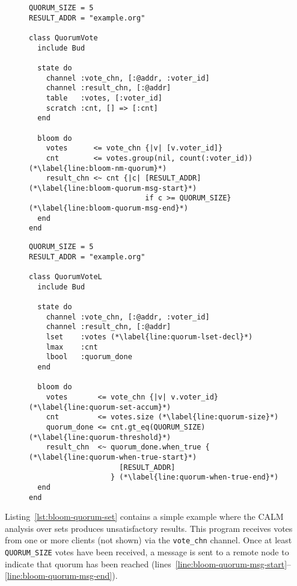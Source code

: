 \begin{figure}[t]
\begin{minipage}{.48\textwidth}
\begin{lstlisting}[caption=Quorum vote in Bloom (non-monotonic).,label=lst:bloom-quorum-set]
QUORUM_SIZE = 5
RESULT_ADDR = "example.org"

class QuorumVote
  include Bud

  state do
    channel :vote_chn, [:@addr, :voter_id]
    channel :result_chn, [:@addr]
    table   :votes, [:voter_id]
    scratch :cnt, [] => [:cnt]
  end

  bloom do
    votes      <= vote_chn {|v| [v.voter_id]}
    cnt        <= votes.group(nil, count(:voter_id)) (*\label{line:bloom-nm-quorum}*)
    result_chn <~ cnt {|c| [RESULT_ADDR] (*\label{line:bloom-quorum-msg-start}*)
                           if c >= QUORUM_SIZE} (*\label{line:bloom-quorum-msg-end}*)
  end
end
\end{lstlisting}
\end{minipage}
\begin{minipage}{.48\textwidth}
\begin{lstlisting}[caption=Quorum vote in \blooml (monotonic).,label=lst:bloom-quorum-lattice]
QUORUM_SIZE = 5
RESULT_ADDR = "example.org"

class QuorumVoteL
  include Bud

  state do
    channel :vote_chn, [:@addr, :voter_id]
    channel :result_chn, [:@addr]
    lset    :votes (*\label{line:quorum-lset-decl}*)
    lmax    :cnt
    lbool   :quorum_done
  end

  bloom do
    votes       <= vote_chn {|v| v.voter_id} (*\label{line:quorum-set-accum}*)
    cnt         <= votes.size (*\label{line:quorum-size}*)
    quorum_done <= cnt.gt_eq(QUORUM_SIZE) (*\label{line:quorum-threshold}*)
    result_chn  <~ quorum_done.when_true { (*\label{line:quorum-when-true-start}*)
                     [RESULT_ADDR]
                   } (*\label{line:quorum-when-true-end}*)
  end
end
\end{lstlisting}
\end{minipage}
\end{figure}

Listing~\ref{lst:bloom-quorum-set} contains a simple example where the CALM
analysis over sets produces unsatisfactory results. This program receives votes
from one or more clients (not shown) via the \texttt{vote\_chn} channel. Once at
least \texttt{QUORUM\_SIZE} votes have been received, a message is sent to a
remote node to indicate that quorum has been reached
(lines~\ref{line:bloom-quorum-msg-start}--\ref{line:bloom-quorum-msg-end}).

